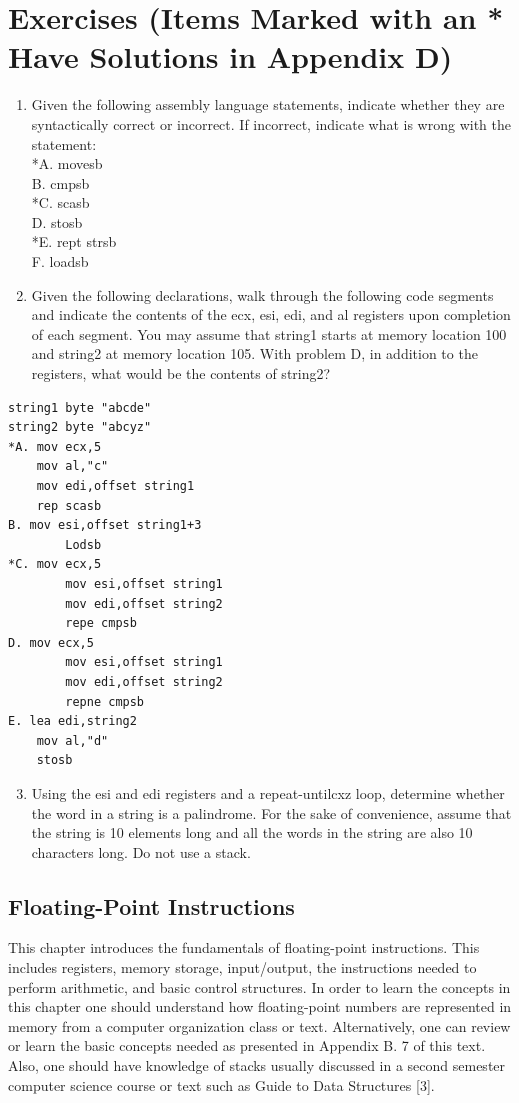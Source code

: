 \documentclass[10pt]{book}
\begin{document}
\section{Exercises (Items Marked with an * Have Solutions in Appendix D)}
\begin{enumerate}
  \item Given the following assembly language statements, indicate whether they are syntactically correct or incorrect. If incorrect, indicate what is wrong with the statement:\\
*A. movesb\\
B. cmpsb\\
*C. scasb\\
D. stosb\\
*E. rept strsb\\
F. loadsb
  \item Given the following declarations, walk through the following code segments and indicate the contents of the ecx, esi, edi, and al registers upon completion of each segment. You may assume that string1 starts at memory location 100 and string2 at memory location 105. With problem D, in addition to the registers, what would be the contents of string2?
\end{enumerate}

\begin{verbatim}
string1 byte "abcde"
string2 byte "abcyz"
*A. mov ecx,5
    mov al,"c"
    mov edi,offset string1
    rep scasb
B. mov esi,offset string1+3
        Lodsb
*C. mov ecx,5
        mov esi,offset string1
        mov edi,offset string2
        repe cmpsb
D. mov ecx,5
        mov esi,offset string1
        mov edi,offset string2
        repne cmpsb
E. lea edi,string2
    mov al,"d"
    stosb
\end{verbatim}

\begin{enumerate}
  \setcounter{enumi}{2}
  \item Using the esi and edi registers and a repeat-untilcxz loop, determine whether the word in a string is a palindrome. For the sake of convenience, assume that the string is 10 elements long and all the words in the string are also 10 characters long. Do not use a stack.
\end{enumerate}
\subsection{Floating-Point Instructions}
This chapter introduces the fundamentals of floating-point instructions. This includes registers, memory storage, input/output, the instructions needed to perform arithmetic, and basic control structures. In order to learn the concepts in this chapter one should understand how floating-point numbers are represented in memory from a computer organization class or text. Alternatively, one can review or learn the basic concepts needed as presented in Appendix B. 7 of this text. Also, one should have knowledge of stacks usually discussed in a second semester computer science course or text such as Guide to Data Structures [3].
\end{document}
